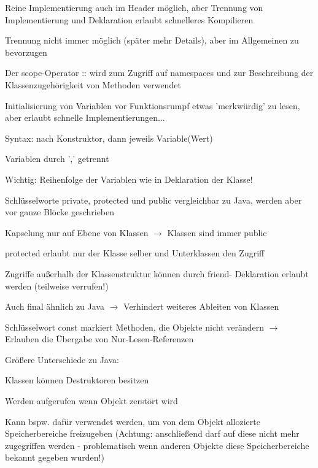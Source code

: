 \documentclass[10pt]{article}
\begin{document}
\begin{itemize*}
  \item Reine Implementierung auch im Header möglich, aber Trennung von Implementierung und Deklaration erlaubt schnelleres Kompilieren
  \item Trennung nicht immer möglich (später mehr Details), aber im Allgemeinen zu bevorzugen
  \item Der scope-Operator :: wird zum Zugriff auf namespaces und zur Beschreibung der Klassenzugehörigkeit von Methoden verwendet
  \item Initialisierung von Variablen vor Funktionsrumpf etwas 'merkwürdig' zu lesen, aber erlaubt schnelle Implementierungen...
  \begin{itemize*}
    \item Syntax: nach Konstruktor, dann jeweils Variable(Wert)
    \item Variablen durch ',' getrennt
    \item Wichtig: Reihenfolge der Variablen wie in Deklaration der Klasse!
  \end{itemize*}
  \item Schlüsselworte private, protected und public vergleichbar zu Java, werden aber vor ganze Blöcke geschrieben
  \begin{itemize*}
    \item Kapselung nur auf Ebene von Klassen $\rightarrow$ Klassen sind immer public
    \item protected erlaubt nur der Klasse selber und Unterklassen den Zugriff
  \end{itemize*}
  \item Zugriffe außerhalb der Klassenstruktur können durch friend- Deklaration erlaubt werden (teilweise verrufen!)
  \item Auch final ähnlich zu Java $\rightarrow$ Verhindert weiteres Ableiten von Klassen
  \item Schlüsselwort const markiert Methoden, die Objekte nicht verändern $\rightarrow$ Erlauben die Übergabe von Nur-Lesen-Referenzen
  \item Größere Unterschiede zu Java:
  \begin{itemize*}
    \item Klassen können Destruktoren besitzen
    \begin{itemize*}
      \item Werden aufgerufen wenn Objekt zerstört wird
      \item Kann bspw. dafür verwendet werden, um von dem Objekt allozierte Speicherbereiche freizugeben (Achtung: anschließend darf auf diese nicht mehr zugegriffen werden - problematisch wenn anderen Objekte diese Speicherbereiche bekannt gegeben wurden!)

\end{itemize*}
\end{itemize*}
\end{itemize*}
\end{document}
